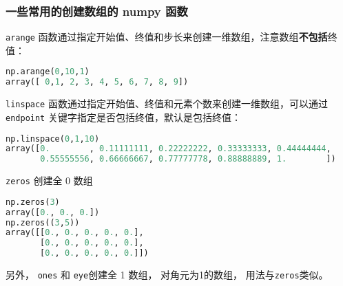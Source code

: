 \subsubsection{一些常用的创建数组的 numpy 函数}
\verb`arange` 函数通过指定开始值、终值和步长来创建一维数组，注意数组\textbf{不包括}终值：
\begin{lstlisting}[language=python]
np.arange(0,10,1)
array([ 0,1, 2, 3, 4, 5, 6, 7, 8, 9])
\end{lstlisting}

\verb`linspace` 函数通过指定开始值、终值和元素个数来创建一维数组，可以通过 \verb`endpoint` 关键字指定是否包括终值，默认是包括终值：
 \begin{lstlisting}[language=python]
np.linspace(0,1,10)
array([0.        , 0.11111111, 0.22222222, 0.33333333, 0.44444444,
       0.55555556, 0.66666667, 0.77777778, 0.88888889, 1.        ])
 \end{lstlisting}

\verb`zeros` 创建全 0 数组
\begin{lstlisting}[language=python]
np.zeros(3)
array([0., 0., 0.])
np.zeros((3,5))
array([[0., 0., 0., 0., 0.],
       [0., 0., 0., 0., 0.],
       [0., 0., 0., 0., 0.]])
\end{lstlisting} 
另外， \verb`ones` 和 \verb`eye`创建全 1 数组， 对角元为1的数组， 用法与\verb`zeros`类似。

